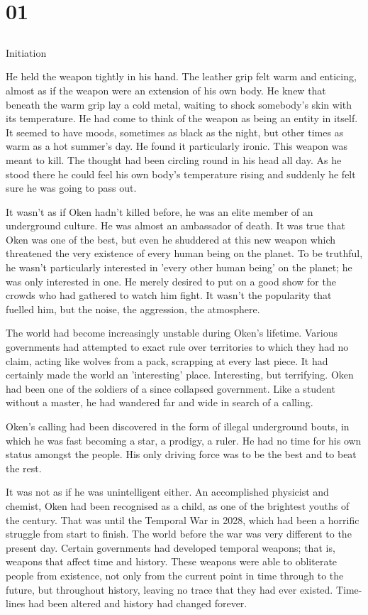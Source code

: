 \chapter{01}
\section{}
Initiation  

He held the weapon tightly in his hand.  The leather grip felt warm and enticing, almost as if the weapon were an extension of his own body.  He knew that beneath the warm grip lay a cold metal, waiting to shock somebody's skin with its temperature.  He had come to think of the weapon as being an entity in itself.  It seemed to have moods, sometimes as black as the night, but other times as warm as a hot summer's day.  He found it particularly ironic.  This weapon was meant to kill.  The thought had been circling round in his head all day.  As he stood there he could feel his own body's temperature rising and suddenly he felt sure he was going to pass out.

It wasn't as if Oken hadn't killed before, he was an elite member of an underground culture.  He was almost an ambassador of death.  It was true that Oken was one of the best, but even he shuddered at this new weapon which threatened the very existence of every human being on the planet.  To be truthful, he wasn't particularly interested in 'every other human being' on the planet; he was only interested in one.  He merely desired to put on a good show for the crowds who had gathered to watch him fight.  It wasn't the popularity that fuelled him, but the noise, the aggression, the atmosphere.

The world had become increasingly unstable during Oken's lifetime.  Various governments had attempted to exact rule over territories to which they had no claim, acting like wolves from a pack, scrapping at every last piece.  It had certainly made the world an 'interesting' place.  Interesting, but terrifying.  Oken had been one of the soldiers of a since collapsed government.  Like a student without a master, he had wandered far and wide in search of a calling.  

Oken's calling had been discovered in the form of illegal underground bouts, in which he was fast becoming a star, a prodigy, a ruler.  He had no time for his own status amongst the people.  His only driving force was to be the best and to beat the rest.  

It was not as if he was unintelligent either.  An accomplished physicist and chemist, Oken had been recognised as a child, as one of the brightest youths of the century.  That was until the Temporal War in 2028, which had been a horrific struggle from start to finish.  The world before the war was very different to the present day.  Certain governments had developed temporal weapons; that is, weapons that affect time and history.  These weapons were able to obliterate people from existence, not only from the current point in time through to the future, but throughout history, leaving no trace that they had ever existed.  Time-lines had been altered and history had changed forever.  

